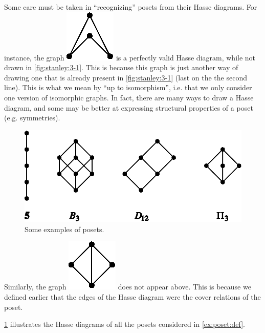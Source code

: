 Some care must be taken in ``recognizing'' posets from their Hasse diagrams. For instance, the graph \includegraphics{fig/stanley/3-1:a} is a perfectly valid Hasse diagram, while not drawn in \ref{fig:stanley:3-1}. This is because this graph is just another way of drawing one that is already present in \ref{fig:stanley:3-1} (last on the the second line).
This is what we mean by ``up to isomorphism'', i.e. that we only consider one version of isomorphic graphs. In fact, there are many ways to draw a Hasse diagram, and some may be better at expressing structural properties of a poset (e.g. symmetries).


\begin{figure}
	\centering
	\includegraphics[height=0.2\textheight]{fig/stanley/3-2}
	\caption{\label{fig:stanley:3-2} Some examples of posets. \cite{Stanley:2011:ECV:2124415}}
\end{figure}


Similarly, the graph \includegraphics{fig/stanley/3-1:b} does not appear above. This is because we defined earlier that the edges of the Hasse diagram were the cover relations of the poset.


\ref{fig:stanley:3-2} illustrates the Hasse diagrams of all the posets considered in \ref{ex:poset:def}.

